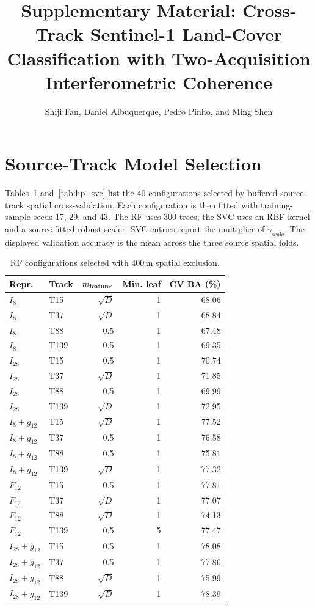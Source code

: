 \documentclass[journal]{IEEEtran}
\begin{document}
\title{Supplementary Material: Cross-Track Sentinel-1 Land-Cover Classification with Two-Acquisition Interferometric Coherence}
\author{Shiji Fan, Daniel Albuquerque, Pedro Pinho, and Ming Shen}
\maketitle
\section{Source-Track Model Selection}
Tables~\ref{tab:hp_rf} and~\ref{tab:hp_svc} list the 40 configurations selected by buffered source-track spatial cross-validation. Each configuration is then fitted with training-sample seeds 17, 29, and 43. The RF uses 300 trees; the SVC uses an RBF kernel and a source-fitted robust scaler. SVC entries report the multiplier of $\gamma_{\mathrm{scale}}$. The displayed validation accuracy is the mean across the three source spatial folds.
\begin{table}[!t]\centering\footnotesize
\caption{RF configurations selected with 400\,m spatial exclusion.}\label{tab:hp_rf}
\setlength{\tabcolsep}{3pt}\begin{tabular}{llrrr}\toprule
Repr. & Track & $m_{\rm features}$ & Min. leaf & CV BA (\%) \\\midrule
$I_8$ & T15 & $\sqrt{D}$ & 1 & 68.06 \\
$I_8$ & T37 & $\sqrt{D}$ & 1 & 68.84 \\
$I_8$ & T88 & 0.5 & 1 & 67.48 \\
$I_8$ & T139 & 0.5 & 1 & 69.35 \\
$I_{28}$ & T15 & 0.5 & 1 & 70.74 \\
$I_{28}$ & T37 & $\sqrt{D}$ & 1 & 71.85 \\
$I_{28}$ & T88 & 0.5 & 1 & 69.99 \\
$I_{28}$ & T139 & $\sqrt{D}$ & 1 & 72.95 \\
$I_8+g_{12}$ & T15 & $\sqrt{D}$ & 1 & 77.52 \\
$I_8+g_{12}$ & T37 & 0.5 & 1 & 76.58 \\
$I_8+g_{12}$ & T88 & 0.5 & 1 & 75.81 \\
$I_8+g_{12}$ & T139 & $\sqrt{D}$ & 1 & 77.32 \\
$F_{12}$ & T15 & 0.5 & 1 & 77.81 \\
$F_{12}$ & T37 & $\sqrt{D}$ & 1 & 77.07 \\
$F_{12}$ & T88 & $\sqrt{D}$ & 1 & 74.13 \\
$F_{12}$ & T139 & 0.5 & 5 & 77.47 \\
$I_{28}+g_{12}$ & T15 & 0.5 & 1 & 78.08 \\
$I_{28}+g_{12}$ & T37 & 0.5 & 1 & 77.86 \\
$I_{28}+g_{12}$ & T88 & $\sqrt{D}$ & 1 & 75.99 \\
$I_{28}+g_{12}$ & T139 & $\sqrt{D}$ & 1 & 78.39 \\
\bottomrule\end{tabular}\end{table}
\end{document}
